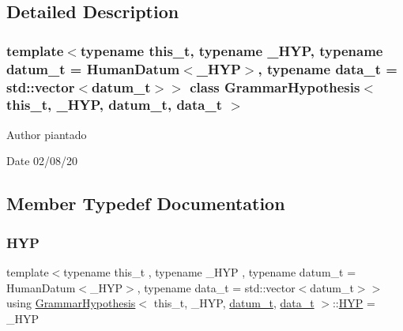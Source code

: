 \subsection{Detailed Description}
\subsubsection*{template$<$typename this\+\_\+t, typename \+\_\+\+H\+YP, typename datum\+\_\+t = Human\+Datum$<$\+\_\+\+H\+Y\+P$>$, typename data\+\_\+t = std\+::vector$<$datum\+\_\+t$>$$>$\newline
class Grammar\+Hypothesis$<$ this\+\_\+t, \+\_\+\+H\+Y\+P, datum\+\_\+t, data\+\_\+t $>$}

\begin{DoxyAuthor}{Author}
piantado 
\end{DoxyAuthor}
\begin{DoxyDate}{Date}
02/08/20 
\end{DoxyDate}


\subsection{Member Typedef Documentation}
\mbox{\label{class_grammar_hypothesis_a28fc99df28de741179719c94ecd77699}} 
\subsubsection{\texorpdfstring{H\+YP}{HYP}}
{\footnotesize\ttfamily template$<$typename this\+\_\+t , typename \+\_\+\+H\+YP , typename datum\+\_\+t  = Human\+Datum$<$\+\_\+\+H\+Y\+P$>$, typename data\+\_\+t  = std\+::vector$<$datum\+\_\+t$>$$>$ \\
using \hyperlink{class_grammar_hypothesis}{Grammar\+Hypothesis}$<$ this\+\_\+t, \+\_\+\+H\+YP, \hyperlink{class_bayesable_a9f1a6c0cd7855550fa10b1a8f13a5867}{datum\+\_\+t}, \hyperlink{class_bayesable_aa2788c4d7718c0a824e1d28c4c98f921}{data\+\_\+t} $>$\+::\hyperlink{class_grammar_hypothesis_a28fc99df28de741179719c94ecd77699}{H\+YP} =  \+\_\+\+H\+YP}

\mbox{\label{class_grammar_hypothesis_a7c6a6c59b0ba1ca6e225079d0cb7143b}} 
